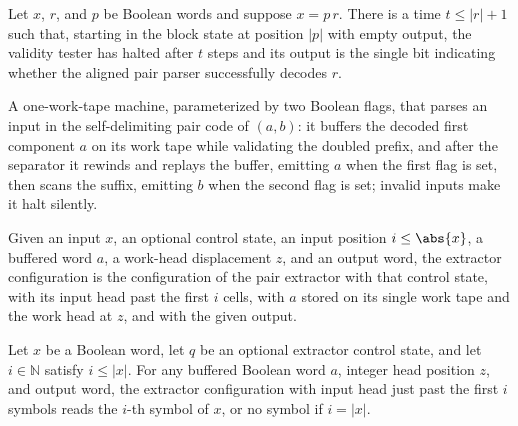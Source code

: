 \begin{lemma}
\label{Turing.FinTM.pairValid_run}
\leanok
{}
Let $x$, $r$, and $p$ be Boolean words and suppose $x=p\,r$. There is a time $t\le
|r|+1$ such that, starting in the block state at position $|p|$ with empty output, the
validity tester has halted after $t$ steps and its output is the single bit indicating
whether the aligned pair parser successfully decodes $r$.
\end{lemma}

\begin{definition}
\label{Turing.FinTM.pairExtractTM}
\leanok
{}
A one-work-tape machine, parameterized by two Boolean flags, that parses an
input in the self-delimiting pair code of $(a,b)$: it buffers the decoded
first component $a$ on its work tape while validating the doubled prefix, and
after the separator it rewinds and replays the buffer, emitting $a$ when the
first flag is set, then scans the suffix, emitting $b$ when the second flag is
set; invalid inputs make it halt silently.
\end{definition}

\begin{definition}
\label{Turing.FinTM.extractCfg}
\leanok
{}
Given an input $x$, an optional control state, an input position
$i \le \abs{x}$, a buffered word $a$, a work-head displacement $z$, and an
output word, the extractor configuration is the configuration of the pair
extractor with that control state, with its input head past the first $i$
cells, with $a$ stored on its single work tape and the work head at $z$, and
with the given output.
\end{definition}

\begin{lemma}
\label{Turing.FinTM.extractCfg_read}
\leanok
{}
Let $x$ be a Boolean word, let $q$ be an optional extractor control state, and let
$i\in\mathbb N$ satisfy $i\le |x|$. For any buffered Boolean word $a$, integer head
position $z$, and output word, the extractor configuration with input head just past the
first $i$ symbols reads the $i$-th symbol of $x$, or no symbol if $i=|x|$.
\end{lemma}

